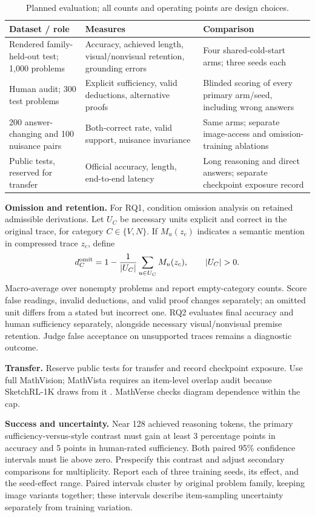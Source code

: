 \documentclass[11pt,letterpaper]{article}
\begin{document}
\begin{table}[ht]
\centering\small
\caption{Planned evaluation; all counts and operating points are design choices.}
\begin{tabular}{@{}p{.25\linewidth}p{.34\linewidth}p{.34\linewidth}@{}}
\toprule
\raggedright Dataset / role & \raggedright Measures & \raggedright Comparison \tabularnewline
\midrule
\raggedright Rendered family-held-out test; 1,000 problems & \raggedright Accuracy, achieved length, visual/nonvisual retention, grounding errors & \raggedright Four shared-cold-start arms; three seeds each \tabularnewline
\raggedright Human audit; 300 test problems & \raggedright Explicit sufficiency, valid deductions, alternative proofs & \raggedright Blinded scoring of every primary arm/seed, including wrong answers \tabularnewline
\raggedright 200 answer-changing and 100 nuisance pairs & \raggedright Both-correct rate, valid support, nuisance invariance & \raggedright Same arms; separate image-access and omission-training ablations \tabularnewline
\raggedright Public tests, reserved for transfer & \raggedright Official accuracy, length, end-to-end latency & \raggedright Long reasoning and direct answers; separate checkpoint exposure record \tabularnewline
\bottomrule
\end{tabular}
\label{tab:experiments}
\end{table}

\textbf{Omission and retention.} For RQ1, condition omission analysis on retained admissible derivations. Let $U_C$ be necessary units explicit and correct in the original trace, for category $C\in\{V,N\}$. If $M_u(z_c)$ indicates a semantic mention in compressed trace $z_c$, define
\[
d_C^{\rm omit}=1-\frac{1}{|U_C|}\sum_{u\in U_C}M_u(z_c),\qquad |U_C|>0.
\]
Macro-average over nonempty problems and report empty-category counts. Score false readings, invalid deductions, and valid proof changes separately; an omitted unit differs from a stated but incorrect one. RQ2 evaluates final accuracy and human sufficiency separately, alongside necessary visual/nonvisual premise retention. Judge false acceptance on unsupported traces remains a diagnostic outcome.

\textbf{Transfer.} Reserve public tests for transfer and record checkpoint exposure. Use full MathVision; MathVista requires an item-level overlap audit because SketchRL-1K draws from it \cite{sketch,mathvista}. MathVerse checks diagram dependence within the cap.

\newpage
\textbf{Success and uncertainty.} Near 128 achieved reasoning tokens, the primary sufficiency-versus-style contrast must gain at least 3 percentage points in accuracy and 5 points in human-rated sufficiency. Both paired 95\% confidence intervals must lie above zero. Prespecify this contrast and adjust secondary comparisons for multiplicity. Report each of three training seeds, its effect, and the seed-effect range. Paired intervals cluster by original problem family, keeping image variants together; these intervals describe item-sampling uncertainty separately from training variation.
\end{document}
